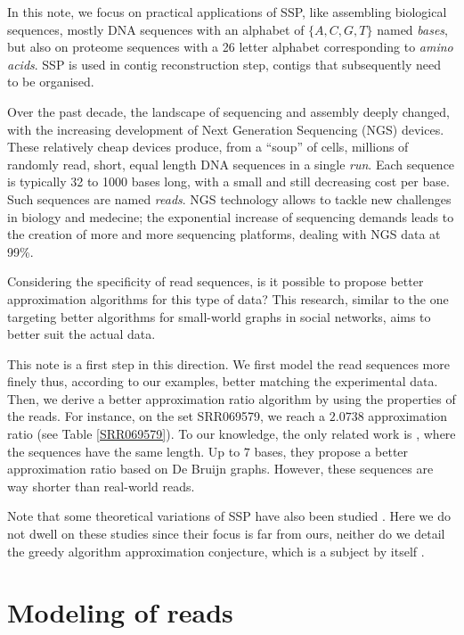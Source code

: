 \documentclass[10pt]{article}
\begin{document}
In this note, we focus on practical applications of SSP, like assembling biological sequences, mostly DNA sequences with an alphabet of $\{A,C,G,T\}$ named {\em bases}, but also on proteome
sequences with a 26 letter alphabet corresponding to {\em amino acids}. SSP is
used in contig reconstruction step, contigs that subsequently need to be organised.

Over the past decade, the landscape of sequencing and assembly deeply
changed, with the increasing development of Next Generation Sequencing (NGS)
devices. These relatively cheap devices produce, from a ``soup'' of cells, millions of randomly read, short, equal length DNA sequences in a single {\em run}.
Each sequence is typically 32 to 1000 bases long, with a small and still decreasing cost per
base. Such sequences are named {\em reads}. NGS technology allows to
tackle new challenges in biology and medecine; the exponential
increase of sequencing demands leads to the creation of more and
more sequencing platforms, dealing with NGS data at 99\%.

Considering the specificity of read sequences, is it possible to propose better
approximation algorithms for this type of data? This research,
similar to the one targeting better algorithms for small-world graphs in
social networks, aims to better suit the actual data.

This note is a first step in this direction. We first model the read
sequences more finely thus, according to our examples,
better matching the experimental data.  Then, we derive a better
approximation ratio algorithm by using the properties of the
reads. For instance, on the set SRR069579, we reach a $2.0738$
approximation ratio (see Table \ref{SRR069579}). To our knowledge, the
only related work is \cite{GolovnevKM13}, where the sequences have the
same length. Up to $7$ bases, they propose a better approximation
ratio based on De Bruijn graphs. However, these sequences are way
shorter than real-world reads.

Note that some theoretical variations of SSP have also been studied
\cite{Yu16a, CrochemoreCIKRRW10}. Here we do not dwell on these
studies since their focus is far from ours, neither do we detail the
greedy algorithm approximation conjecture, which is a subject by
itself \cite{TARHIO1988131,KaplanS05,FiciKRRW16}.


\section{Modeling of reads}
\end{document}
